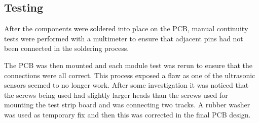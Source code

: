 \subsection{Testing}\label{elec/pcb/test}

After the components were soldered into place on the PCB, manual continuity tests were performed with a multimeter to ensure that adjacent pins had not been connected in the soldering process.

The PCB was then mounted and each module test was rerun to ensure that the connections were all correct. This process exposed a flaw as one of the ultrasonic sensors seemed to no longer work. After some investigation it was noticed that the screws being used had slightly larger heads than the screws used for mounting the test strip board and was connecting two tracks. A rubber washer was used as temporary fix and then this was corrected in the final PCB design. 
